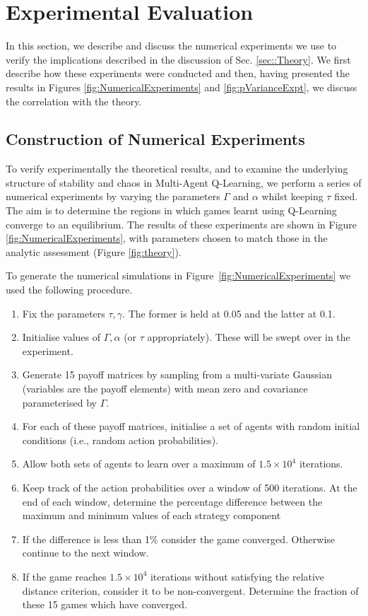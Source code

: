 \documentclass[sigconf,anonymous]{aamas}
\begin{document}

\section{Experimental Evaluation} \label{sec:exev}

In this section, we describe and discuss the numerical experiments we use to verify the implications described in the discussion of Sec. \ref{sec::Theory}. We first describe how these experiments were conducted and then, having presented the results in Figures \ref{fig:NumericalExperiments} and \ref{fig:pVarianceExpt}, we discuss the correlation with the theory.

\subsection{Construction of Numerical Experiments}

To verify experimentally the theoretical results, and to examine the underlying structure of stability and chaos in
Multi-Agent Q-Learning, we perform a series of numerical experiments by varying the parameters $\Gamma$ and
$\alpha$ whilst keeping $\tau$ fixed. The aim is to determine the regions in which games learnt using Q-Learning converge to an equilibrium. The results of these experiments are shown in Figure \ref{fig:NumericalExperiments}, with parameters chosen to match those in the analytic assessment (Figure \ref{fig:theory}).

To generate the numerical simulations in Figure~\ref{fig:NumericalExperiments} we used the
following procedure.
\begin{enumerate}
   \item Fix the parameters $\tau, \gamma$. The former is held at 0.05 and the latter at 0.1.
   \item Initialise values of $\Gamma, \alpha$ (or $\tau$ appropriately). These will be swept over in the experiment.
\item Generate 15 payoff matrices by sampling from a multi-variate Gaussian 
(variables are the payoff elements) with mean zero and covariance parameterised by $\Gamma$.
\item For each of these payoff matrices, initialise a set of agents with random initial conditions (i.e., random action probabilities).
\item Allow both sets of agents to learn over a maximum of $1.5 \times 10^4$ iterations.
\item Keep track of the action probabilities over a window of 500 iterations. At the end of each window, determine the percentage difference between the maximum and minimum values of each strategy component
\item If the difference is less than 1\% consider the game converged. Otherwise continue to the next window.
\item If the game reaches $1.5 \times 10^4$ iterations without satisfying the relative distance criterion, consider it to be non-convergent. Determine the fraction of these 15 games which have converged.

\end{enumerate}
   
\end{document}
